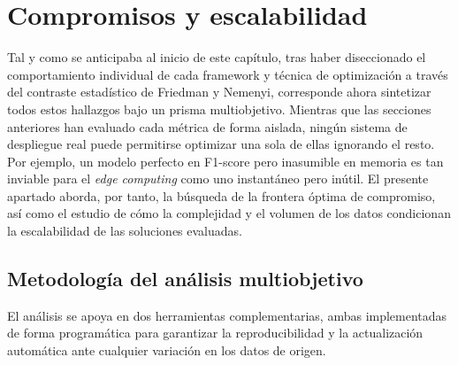 \documentclass[a4paper,12pt,twoside,final]{book}
\begin{document}
\section{Compromisos y escalabilidad}
Tal y como se anticipaba al inicio de este capítulo, tras haber diseccionado el comportamiento individual de cada
framework y técnica de optimización a través del contraste estadístico de Friedman y Nemenyi, corresponde ahora
sintetizar todos estos hallazgos bajo un prisma multiobjetivo. Mientras que las secciones anteriores han evaluado cada
métrica de forma aislada, ningún sistema de despliegue real puede permitirse optimizar una sola de ellas ignorando el
resto. Por ejemplo, un modelo perfecto en F1-score pero inasumible en memoria es tan inviable para el
\textit{edge computing} como uno instantáneo pero inútil. El presente apartado aborda, por tanto, la búsqueda de la
frontera óptima de compromiso, así como el estudio de cómo la complejidad y el volumen de los datos condicionan la
escalabilidad de las soluciones evaluadas.


\subsection{Metodología del análisis multiobjetivo}
El análisis se apoya en dos herramientas complementarias, ambas implementadas de forma programática para garantizar la
reproducibilidad y la actualización automática ante cualquier variación en los datos de origen.\\
\end{document}
